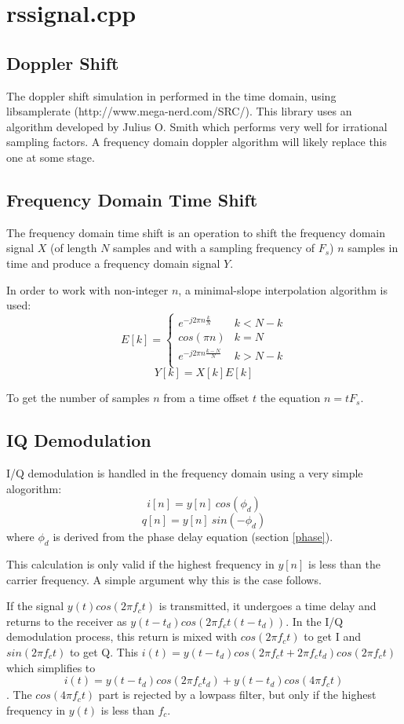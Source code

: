 \documentclass[a4paper,10pt]{article}
\begin{document}
\section {rssignal.cpp}

\subsection{Doppler Shift}
The doppler shift simulation in performed in the time domain, using libsamplerate (http://www.mega-nerd.com/SRC/). This library uses an algorithm developed by Julius O. Smith\cite{smith} which performs very well for irrational sampling factors. A frequency domain doppler algorithm will likely replace this one at some stage.

\subsection{Frequency Domain Time Shift}
The frequency domain time shift is an operation to shift the frequency domain signal $X$ (of length $N$ samples and with a sampling frequency of $F_s$) $n$ samples in time and produce a frequency domain signal $Y$.

In order to work with non-integer $n$, a minimal-slope interpolation algorithm is used:
\begin{equation*}
E[k]=\begin{cases}
	e^{-j 2 \pi n \frac{k}{N} } & k < N-k \\
	cos(\pi n) & k = N \\
	e^{-j 2 \pi n \frac{k-N}{N} } & k > N-k \\
       \end{cases}
\end{equation*}
$$Y[k]=X[k]E[k]$$

To get the number of samples $n$ from a time offset $t$ the equation $n = t F_s$.

\subsection{IQ Demodulation}

I/Q demodulation is handled in the frequency domain using a very simple alogorithm:
$$i[n] = y[n]~cos(\phi_d)$$
$$q[n] = y[n]~sin(-\phi_d)$$
where $\phi_d$ is derived from the phase delay equation (section \ref{phase}).

This calculation is only valid if the highest frequency in $y[n]$ is less than the carrier frequency. A simple argument why this is the case follows.

If the signal $y(t) cos(2\pi f_c t)$ is transmitted, it undergoes a time delay and returns to the receiver as $y(t-t_d) cos\left(2\pi f_c t (t-t_d)\right)$. In the I/Q demodulation process, this return is mixed with $cos(2\pi f_c t)$ to get I and $sin(2\pi f_c t)$ to get Q. This $i(t) = y(t-t_d) cos(2\pi f_c t + 2\pi f_c t_d) cos(2\pi f_c t)$ which simplifies to
$$i(t) = y(t-t_d) cos(2\pi f_c t_d) + y(t-t_d) cos(4 \pi f_c t)$$.
The $cos(4 \pi f_c t)$ part is rejected by a lowpass filter, but only if the highest frequency in $y(t)$ is less than $f_c$.



\end{document}
